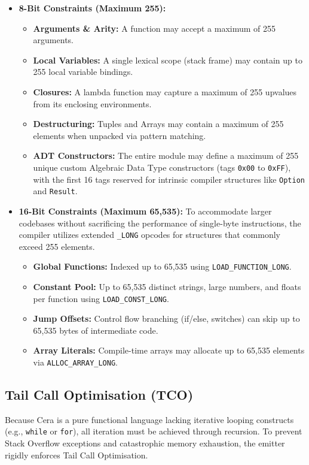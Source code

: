 \documentclass[11pt, a4paper]{article}
\begin{document}
\begin{itemize}
    \item \textbf{8-Bit Constraints (Maximum 255):}
    \begin{itemize}
        \item \textbf{Arguments \& Arity:} A function may accept a maximum of 255 arguments.
        \item \textbf{Local Variables:} A single lexical scope (stack frame) may contain up to 255 local variable bindings.
        \item \textbf{Closures:} A lambda function may capture a maximum of 255 upvalues from its enclosing environments.
        \item \textbf{Destructuring:} Tuples and Arrays may contain a maximum of 255 elements when unpacked via pattern matching.
        \item \textbf{ADT Constructors:} The entire module may define a maximum of 255 unique custom Algebraic Data Type constructors (tags \texttt{0x00} to \texttt{0xFF}), with the first 16 tags reserved for intrinsic compiler structures like \texttt{Option} and \texttt{Result}.
    \end{itemize}
    
    \item \textbf{16-Bit Constraints (Maximum 65,535):}
    To accommodate larger codebases without sacrificing the performance of single-byte instructions, the compiler utilizes extended \texttt{\_LONG} opcodes for structures that commonly exceed 255 elements.
    \begin{itemize}
        \item \textbf{Global Functions:} Indexed up to 65,535 using \texttt{LOAD\_FUNCTION\_LONG}.
        \item \textbf{Constant Pool:} Up to 65,535 distinct strings, large numbers, and floats per function using \texttt{LOAD\_CONST\_LONG}.
        \item \textbf{Jump Offsets:} Control flow branching (if/else, switches) can skip up to 65,535 bytes of intermediate code.
        \item \textbf{Array Literals:} Compile-time arrays may allocate up to 65,535 elements via \texttt{ALLOC\_ARRAY\_LONG}.
    \end{itemize}
\end{itemize}

\subsection{Tail Call Optimisation (TCO)}
\noindent
Because Cera is a pure functional language lacking iterative looping constructs (e.g., \texttt{while} or \texttt{for}), all iteration must be achieved through recursion. To prevent Stack Overflow exceptions and catastrophic memory exhaustion, the emitter rigidly enforces Tail Call Optimisation.
\end{document}
